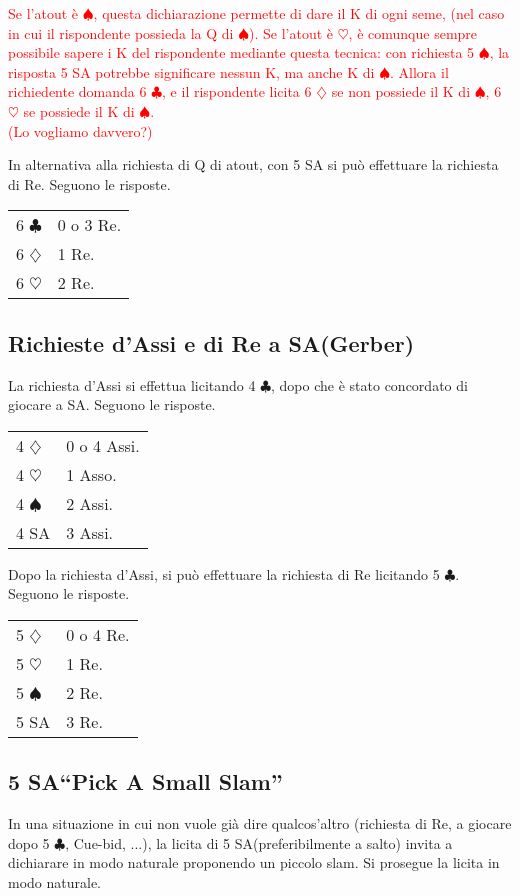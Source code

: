 \documentclass[a4paper,10pt]{article}
\renewcommand{\c}{$\clubsuit$\xspace}
\renewcommand{\d}{$\diamondsuit$\xspace}
\newcommand{\h}{$\heartsuit$\xspace}
\newcommand{\s}{$\spadesuit$\xspace}
\newcommand{\sa}{SA\xspace}
\newcommand{\smallspace}{\vskip0.3cm}
\newcommand{\note}[1]{\textcolor{red}{#1}}
\newenvironment{twocol}
  {\smallspace\noindent\begin{tabular}{l p{0.78\textwidth}}}
  {\end{tabular}\smallspace}
\begin{document}
\note{Se l'atout è \s, questa dichiarazione permette di dare il K di ogni seme, (nel caso in cui il rispondente possieda la Q di \s). Se l'atout è \h, è comunque sempre possibile sapere i K del rispondente mediante questa tecnica: con richiesta 5 \s, la risposta 5 \sa potrebbe significare nessun K, ma anche K di \s.
Allora il richiedente domanda 6 \c, e il rispondente licita 6 \d se non possiede il K di \s, 6 \h se possiede il K di \s.\\
(Lo vogliamo davvero?)}


\smallspace

\noindent In alternativa alla richiesta di Q di atout, con 5 \sa si può effettuare la richiesta di Re. Seguono le risposte.

\begin{twocol}
6 \c & 0 o 3 Re.\\
6 \d & 1 Re.\\
6 \h & 2 Re.\\
\end{twocol}


\subsection{Richieste d'Assi e di Re a \sa (Gerber)}

La richiesta d'Assi si effettua licitando 4 \c, dopo che è stato concordato di giocare a \sa. Seguono le risposte.
\begin{twocol}
  4 \d & 0 o 4 Assi.\\
  4 \h & 1 Asso.\\
  4 \s & 2 Assi.\\
  4 \sa & 3 Assi.
\end{twocol}

\noindent Dopo la richiesta d'Assi, si può effettuare la richiesta di Re licitando 5 \c. Seguono le risposte.
\begin{twocol}
  5 \d & 0 o 4 Re.\\
  5 \h & 1 Re.\\
  5 \s & 2 Re.\\
  5 \sa & 3 Re.
\end{twocol}


\subsection{5 \sa ``Pick A Small Slam''}

In una situazione in cui non vuole già dire qualcos'altro (richiesta di Re, a giocare dopo 5 \c, Cue-bid, ...), la licita di 5 \sa (preferibilmente a salto) invita a dichiarare in modo naturale proponendo un piccolo slam. Si prosegue la licita in modo naturale.
\end{document}
